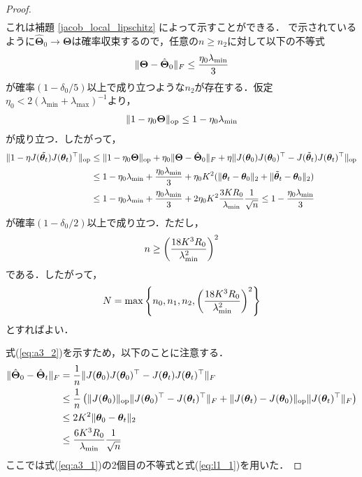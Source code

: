 \begin{proof}
\begin{align}
    \end{align}
    これは補題 \ref{jacob_local_lipschitz} によって示すことができる．\citet{yang2019scaling} で示されているように$\hat{\bm{\Theta}}_0 \rightarrow \bm{\Theta}$は確率収束するので，任意の$n \geq n_2$に対して以下の不等式
    \begin{align}
        \|\bm{\Theta} - \hat{\bm{\Theta}}_0\|_F \leq \dfrac{\eta_0 \lambda_{\min}}{3}
    \end{align}
    が確率$(1 - \delta_0 / 5)$以上で成り立つような$n_2$が存在する．仮定$\eta_0 < 2(\lambda_{\min} + \lambda_{\max})^{-1}$より，
    \begin{align}
        \|1 - \eta_0 \bm{\Theta}\|_{\mathrm{op}} \leq 1 - \eta_0 \lambda_{\min}
    \end{align}
    が成り立つ．したがって，
    \begin{align}
        \|1 - \eta J(\tilde{\bm{\theta}_t})J(\bm{\theta}_t)^\top\|_{\mathrm{op}} &\leq \|1 - \eta_0 \bm{\Theta}\|_{\mathrm{op}} + \eta_0 \|\bm{\Theta} - \hat{\bm{\Theta}}_0\|_F + \eta\|J(\bm{\theta}_0)J(\bm{\theta}_0)^\top - J(\tilde{\bm{\theta}}_t)J(\bm{\theta}_t)^\top\|_{\mathrm{op}} \\
        &\leq 1 - \eta_0 \lambda_{\min} + \dfrac{\eta_0 \lambda_{\min}}{3} + \eta_0 K^2 (\|\bm{\theta}_t - \bm{\theta}_0\|_2 + \|\tilde{\bm{\theta}}_t - \bm{\theta}_0\|_2) \\
        &\leq 1 - \eta_0 \lambda_{\min} + \dfrac{\eta_0 \lambda_{\min}}{3} + 2\eta_0 K^2 \dfrac{3KR_0}{\lambda_{\min}}\dfrac{1}{\sqrt{n}} \leq 1 - \dfrac{\eta_0 \lambda_{\min}}{3}
    \end{align}
    が確率$(1 - \delta_0 / 2)$以上で成り立つ．ただし，
    \begin{align}
        n \geq \left(\dfrac{18K^3 R_0}{\lambda_{\min}^2}\right)^2
    \end{align}
    である．したがって，
    \begin{align}
        N = \max\left\{n_0, n_1, n_2, \left(\dfrac{18K^3 R_0}{\lambda_{\min}^2}\right)^2\right\}
    \end{align}
    とすればよい．

    式(\ref{eq:a3_2})を示すため，以下のことに注意する．
    \begin{align}
        \|\hat{\bm{\Theta}}_0 - \hat{\bm{\Theta}}_t\|_F &= \dfrac{1}{n}\|J(\bm{\theta}_0)J(\bm{\theta}_0)^\top - J(\bm{\theta}_t)J(\bm{\theta}_t)^\top\|_F \\
        &\leq \dfrac{1}{n}\left(\|J(\bm{\theta}_0)\|_{\mathrm{op}}\|J(\bm{\theta}_0)^\top - J(\bm{\theta}_t)^\top\|_F + \|J(\bm{\theta}_t) - J(\bm{\theta}_0)\|_{\mathrm{op}}\|J(\bm{\theta}_t)^\top\|_F\right) \\
        &\leq 2K^2 \|\bm{\theta}_0 - \bm{\theta}_t\|_2 \\
        &\leq \dfrac{6K^3 R_0}{\lambda_{\min}}\dfrac{1}{\sqrt{n}}
    \end{align}
    ここでは式(\ref{eq:a3_1})の2個目の不等式と式(\ref{eq:l1_1})を用いた．
\end{proof}